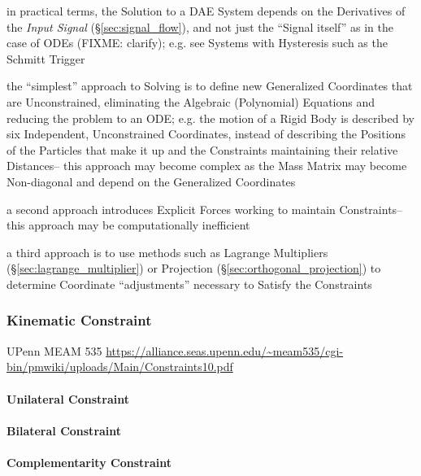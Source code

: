 in practical terms, the Solution to a DAE System depends on the Derivatives of
the \emph{Input Signal} (\S\ref{sec:signal_flow}), and not just the ``Signal
itself'' as in the case of ODEs (FIXME: clarify); e.g. see Systems with
Hysteresis such as the Schmitt Trigger

the ``simplest'' approach to Solving is to define new Generalized Coordinates
that are Unconstrained, eliminating the Algebraic (Polynomial) Equations and
reducing the problem to an ODE; e.g. the motion of a Rigid Body is described by
six Independent, Unconstrained Coordinates, instead of describing the Positions
of the Particles that make it up and the Constraints maintaining their relative
Distances-- this approach may become complex as the Mass Matrix may become
Non-diagonal and depend on the Generalized Coordinates

a second approach introduces Explicit Forces working to maintain Constraints--
this approach may be computationally inefficient

a third approach is to use methods such as Lagrange Multipliers
(\S\ref{sec:lagrange_multiplier}) or Projection
(\S\ref{sec:orthogonal_projection}) to determine Coordinate ``adjustments''
necessary to Satisfy the Constraints



\subsubsection{Kinematic Constraint}\label{sec:kinematic_constraint}


UPenn MEAM 535
\url{https://alliance.seas.upenn.edu/~meam535/cgi-bin/pmwiki/uploads/Main/Constraints10.pdf}



\paragraph{Unilateral Constraint}\label{sec:unilateral_constraint}\hfill

\paragraph{Bilateral Constraint}\label{sec:bilateral_constraint}\hfill

\paragraph{Complementarity Constraint}
\label{sec:complementarity_constraint}\hfill

